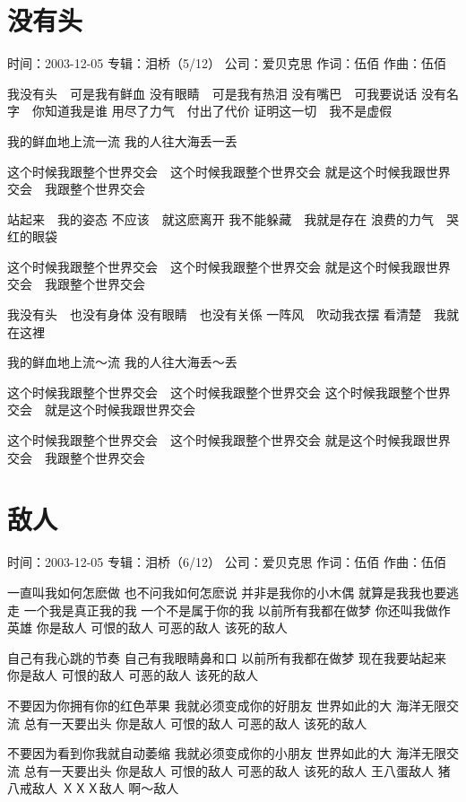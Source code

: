 \documentclass[UTF8,a4paper,oneside,twocolumn,12pt]{ctexbook}
\newcommand{\infopair}[2]{\textbullet #1：#2}
\newcommand{\zc}[1][伍佰]{\infopair{作词}{#1}}
\newcommand{\zq}[1][伍佰]{\infopair{作曲}{#1}}
\newcommand{\zj}[1]{\infopair{专辑}{#1}}
\newcommand{\sj}[1]{\infopair{时间}{#1}}
\newcommand{\gs}[1]{\infopair{公司}{#1}}
\newenvironment{info}{\begin{flushleft}\kaishu
	}
	{\end{flushleft}\normalsize\yahei\par}
\newenvironment{lyric}{
	}
{}
\begin{document}
\section{没有头}
\begin{info}
	\sj{2003-12-05}
	\zj{泪桥（5/12）}
	\gs{爱贝克思}
	\zc
	\zq
\end{info}
\begin{lyric}
	我没有头　可是我有鲜血
	没有眼睛　可是我有热泪
	没有嘴巴　可我要说话
	没有名字　你知道我是谁
	用尽了力气　付出了代价
	证明这一切　我不是虚假

	我的鲜血地上流一流
	我的人往大海丢一丢

	这个时候我跟整个世界交会　这个时候我跟整个世界交会
	就是这个时候我跟世界交会　我跟整个世界交会

	站起来　我的姿态
	不应该　就这麽离开
	我不能躲藏　我就是存在
	浪费的力气　哭红的眼袋

	这个时候我跟整个世界交会　这个时候我跟整个世界交会
	就是这个时候我跟世界交会　我跟整个世界交会

	我没有头　也没有身体
	没有眼睛　也没有关係
	一阵风　吹动我衣摆
	看清楚　我就在这裡

	我的鲜血地上流～流
	我的人往大海丢～丢

	这个时候我跟整个世界交会　这个时候我跟整个世界交会
	这个时候我跟整个世界交会　就是这个时候我跟世界交会

	这个时候我跟整个世界交会　这个时候我跟整个世界交会
	就是这个时候我跟世界交会　我跟整个世界交会
\end{lyric}

\section{敌人}
\begin{info}
	\sj{2003-12-05}
	\zj{泪桥（6/12）}
	\gs{爱贝克思}
	\zc
	\zq
\end{info}
\begin{lyric}
	一直叫我如何怎麽做
	也不问我如何怎麽说
	并非是我你的小木偶
	就算是我我也要逃走
	一个我是真正我的我
	一个不是属于你的我
	以前所有我都在做梦
	你还叫我做作英雄
	你是敌人
	可恨的敌人
	可恶的敌人
	该死的敌人

	自己有我心跳的节奏
	自己有我眼睛鼻和口
	以前所有我都在做梦
	现在我要站起来
	你是敌人
	可恨的敌人
	可恶的敌人
	该死的敌人

	不要因为你拥有你的红色苹果
	我就必须变成你的好朋友
	世界如此的大 海洋无限交流
	总有一天要出头
	你是敌人
	可恨的敌人
	可恶的敌人
	该死的敌人

	不要因为看到你我就自动萎缩
	我就必须变成你的小朋友
	世界如此的大 海洋无限交流
	总有一天要出头
	你是敌人
	可恨的敌人
	可恶的敌人
	该死的敌人
	王八蛋敌人
	猪八戒敌人
	ＸＸＸ敌人
	啊～敌人
\end{lyric}
\end{document}
